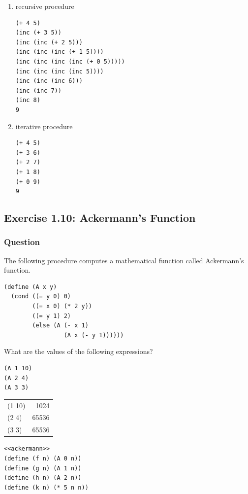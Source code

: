 \documentclass[final,fleqn,titlepage,twoside]{article}
\begin{document}
\begin{enumerate}
\item recursive procedure
\label{sec:org8925f15}
\begin{verbatim}
(+ 4 5)
(inc (+ 3 5))
(inc (inc (+ 2 5)))
(inc (inc (inc (+ 1 5))))
(inc (inc (inc (inc (+ 0 5)))))
(inc (inc (inc (inc 5))))
(inc (inc (inc 6)))
(inc (inc 7))
(inc 8)
9
\end{verbatim}

\item iterative procedure
\label{sec:orgb6d696c}
\begin{verbatim}
(+ 4 5)
(+ 3 6)
(+ 2 7)
(+ 1 8)
(+ 0 9)
9
\end{verbatim}
\end{enumerate}

\subsection{Exercise 1.10: Ackermann's Function}
\label{sec:org1737b78}
\subsubsection{Question}
\label{sec:orge5b3db1}
The following procedure computes a mathematical function called Ackermann's
function.

\begin{verbatim}
(define (A x y)
  (cond ((= y 0) 0)
        ((= x 0) (* 2 y))
        ((= y 1) 2)
        (else (A (- x 1)
                 (A x (- y 1))))))
\end{verbatim}

What are the values of the following expressions?

\begin{verbatim}
(A 1 10)
(A 2 4)
(A 3 3)
\end{verbatim}
\begin{center}
\begin{tabular}{lr}
(1 10) & 1024\\[0pt]
(2 4) & 65536\\[0pt]
(3 3) & 65536\\[0pt]
\end{tabular}
\end{center}

\begin{verbatim}
<<ackermann>>
(define (f n) (A 0 n))
(define (g n) (A 1 n))
(define (h n) (A 2 n))
(define (k n) (* 5 n n))
\end{verbatim}
\end{document}
